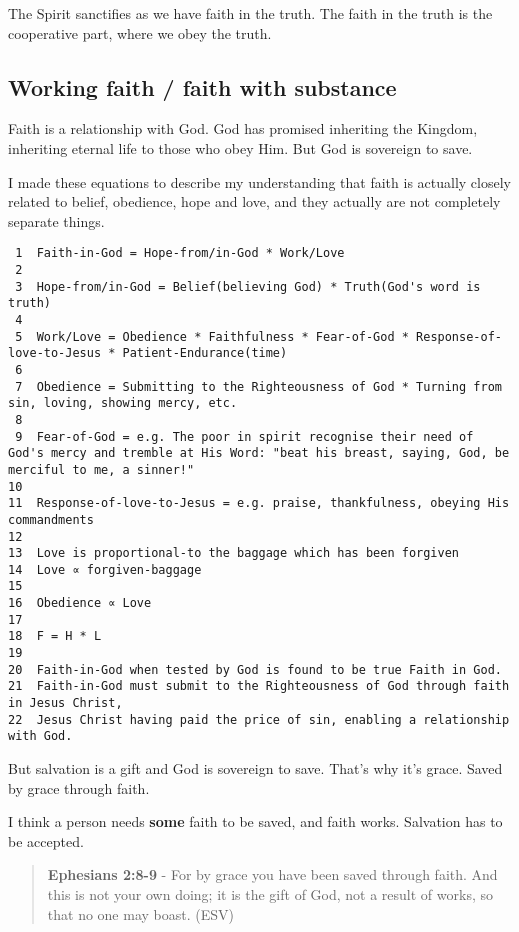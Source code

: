 \documentclass[11pt]{article}
\begin{document}
The Spirit sanctifies as we have faith in the truth.
The faith in the truth is the cooperative part, where we obey the truth.

\subsection{Working faith / faith with substance}
\label{sec:org18b2773}

Faith is a relationship with God. God has promised inheriting the Kingdom, inheriting eternal life to those who obey Him. But God is sovereign to save.

I made these equations to describe my understanding that faith is actually closely related to belief, obedience, hope and love, and they actually are not completely separate things.

\begin{verbatim}
 1  Faith-in-God = Hope-from/in-God * Work/Love
 2  
 3  Hope-from/in-God = Belief(believing God) * Truth(God's word is truth)
 4  
 5  Work/Love = Obedience * Faithfulness * Fear-of-God * Response-of-love-to-Jesus * Patient-Endurance(time)
 6  
 7  Obedience = Submitting to the Righteousness of God * Turning from sin, loving, showing mercy, etc.
 8  
 9  Fear-of-God = e.g. The poor in spirit recognise their need of God's mercy and tremble at His Word: "beat his breast, saying, God, be merciful to me, a sinner!"
10  
11  Response-of-love-to-Jesus = e.g. praise, thankfulness, obeying His commandments
12  
13  Love is proportional-to the baggage which has been forgiven
14  Love ∝ forgiven-baggage
15  
16  Obedience ∝ Love
17  
18  F = H * L
19  
20  Faith-in-God when tested by God is found to be true Faith in God.
21  Faith-in-God must submit to the Righteousness of God through faith in Jesus Christ,
22  Jesus Christ having paid the price of sin, enabling a relationship with God.
\end{verbatim}

But salvation is a gift and God is sovereign to save.
That's why it's grace.
Saved by grace through faith.

I think a person needs \textbf{some} faith to be saved, and faith works. Salvation has to be accepted.

\begin{quote}
\textbf{Ephesians 2:8-9} - For by grace you have been saved through faith. And this is not your own doing; it is the gift of God, not a result of works, so that no one may boast. (ESV)
\end{quote}
\end{document}
